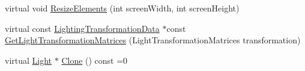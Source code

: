 \begin{DoxyCompactItemize}
\item 
virtual void \mbox{\hyperlink{class_geometry_engine_1_1_geometry_world_item_1_1_geometry_light_1_1_light_a18009ba6ef9c788f3d33d1ebd78a2140}{Resize\+Elements}} (int screen\+Width, int screen\+Height)
\item 
virtual const \mbox{\hyperlink{class_geometry_engine_1_1_lighting_transformation_data}{Lighting\+Transformation\+Data}} $\ast$const \mbox{\hyperlink{class_geometry_engine_1_1_geometry_world_item_1_1_geometry_light_1_1_light_a332c999d4f704855683e079d99b563b2}{Get\+Light\+Transformation\+Matrices}} (Light\+Transformation\+Matrices transformation)
\item 
virtual \mbox{\hyperlink{class_geometry_engine_1_1_geometry_world_item_1_1_geometry_light_1_1_light}{Light}} $\ast$ \mbox{\hyperlink{class_geometry_engine_1_1_geometry_world_item_1_1_geometry_light_1_1_light_af367fa7201ad377a45fdc13e2002c518}{Clone}} () const =0
\end{DoxyCompactItemize}
